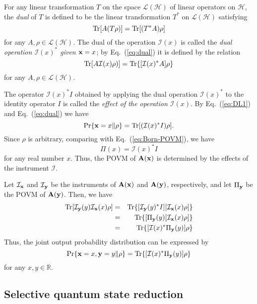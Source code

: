 \documentclass[12pt]{article}
\newcommand{\beq}{\begin{equation}}
\newcommand{\eeq}{\end{equation}}
\newcommand{\beql}[1]{\begin{equation}\label{eq:#1}}
\newcommand{\beqa}{\begin{eqnarray}}
\newcommand{\eeqa}{\end{eqnarray}}
\newcommand{\bA}{{\bf A}}
\newcommand{\cH}{{\mathcal H}}
\newcommand{\cI}{{\mathcal I}}
\newcommand{\cL}{{\mathcal L}}
\newcommand{\nn}{\nonumber}
\newcommand{\rh}{\rho}
\newcommand{\tc}{\cL}
\newcommand{\Eq}[1]{Eq.~(\ref{eq:#1})}
\newcommand{\Tr}{\mbox{\rm Tr}}
\newcommand{\bx}{{\bf x}}
\newcommand{\by}{{\bf y}}
\newcommand{\R}{\mathbb{R}}
\begin{document}
For any linear transformation $T$ on the
space $\tc(\cH)$ of linear operators on $\cH$,
the {\em dual} of $T$ is defined to be the linear
transformation $T^{*}$ on  $\cL(\cH)$ satisfying 
\beql{dual}
\Tr[A(T\rh)]=\Tr[(T^{*}A)\rh]
\eeq
for any $A, \rh\in\cL(\cH)$. 
The dual  of the operation $\cI(x)$ is called the 
{\em dual operation $\cI(x)^{*}$ given  $\bx=x$};
by \Eq{dual} it is defined by the relation
\beql{dual-operation}
\Tr[A\cI(x)\rh)]=\Tr\{[\cI(x)^{*}A]\rh\}
\eeq
for any $A, \rh\in\cL(\cH)$.

The operator $\cI(x)^{*}I$ obtained by applying
the dual operation $\cI(x)^{*}$ to the identity operator $I$
is called the {\em effect of the operation $\cI(x)$}.
By \Eq{DL1} and \Eq{dual} we have
\beq
\Pr\{\bx=x\|\rh\}=\Tr[(\cI(x)^{*}I)\rh].
\eeq
Since $\rh$ is arbitrary, comparing with \Eq{Born-POVM},
we have
\beq
\Pi(x)=\cI(x)^{*}I
\eeq
for any real number $x$.  Thus, the POVM of $\bA(\bx)$ is
determined by the effects of the instrument $\cI$.

Let $\cI_{\bx}$ and $\cI_{\by}$ be the instruments of
$\bA(\bx)$ and $\bA(\by)$, respectively, and let $\Pi_{\by}$ be the
POVM of $\bA(\by)$. 
Then, we have
\beqa
\Tr[\cI_{\by}(y)\cI_{\bx}(x)\rh]&=&
\Tr\{[\cI_{\by}(y)^{*}I][\cI_{\bx}(x)\rh]\}\nn\\
&=&
\Tr\{[\Pi_{\by}(y)[\cI_{\bx}(x)\rh]\}\nn\\
&=&
\Tr\{[\cI(x)^{*}\Pi_{\by}(y)]\rh\}
\eeqa
Thus, the joint output probability distribution can be expressed by
\beql{JOPD2}
\Pr\{\bx=x,\by=y\|\rh\}
=\Tr\{[\cI(x)^{*}\Pi_{\by}(y)]\rh\}
\eeq
for any $x,y\in\R$.


\subsection{Selective quantum state reduction}
\end{document}
